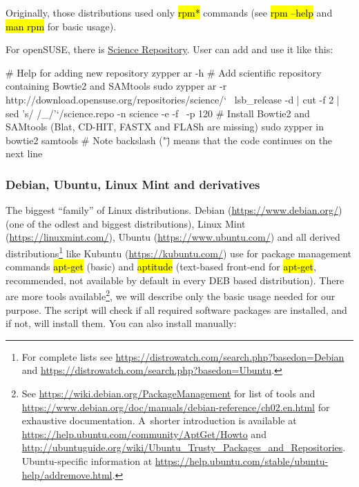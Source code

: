 \documentclass[a4paper, 11pt, twoside]{article}
\renewcommand{\texttt}[1]{\hl{\ttfamily #1}}
\begin{document}
Originally, those distributions used only \texttt{rpm*} commands (see \texttt{rpm --help} and \texttt{man rpm} for basic usage).

For openSUSE, there is \href{https://en.opensuse.org/openSUSE:Science_Repositories}{Science Repository}. User can add and use it like this:

\begin{bashcode}
  # Help for adding new repository
  zypper ar -h
  # Add scientific repository containing Bowtie2 and SAMtools
  sudo zypper ar -r http://download.opensuse.org/repositories/science/` \
    lsb_release -d | cut -f 2 | sed 's/ /_/'`/science.repo -n science -e -f \
    -p 120
  # Install Bowtie2 and SAMtools (Blat, CD-HIT, FASTX and FLASh are missing)
  sudo zypper in bowtie2 samtools
  # Note backslash ("\") means that the code continues on the next line
\end{bashcode}

\subsubsection{Debian, Ubuntu, Linux Mint and derivatives}

The biggest ``family'' of Linux distributions. Debian (\url{https://www.debian.org/}) (one of the odlest and biggest distributions), Linux Mint (\url{https://linuxmint.com/}), Ubuntu (\url{https://www.ubuntu.com/}) and all derived distributions\footnote{For complete lists see \url{https://distrowatch.com/search.php?basedon=Debian} and \url{https://distrowatch.com/search.php?basedon=Ubuntu}.} like Kubuntu (\url{https://kubuntu.com/}) use for package management commands \texttt{apt-get} (basic) and \texttt{aptitude} (text-based front-end for \texttt{apt-get}, recommended, not available by default in every DEB based distribution). There are more tools available\footnote{See \url{https://wiki.debian.org/PackageManagement} for list of tools and \url{https://www.debian.org/doc/manuals/debian-reference/ch02.en.html} for exhaustive documentation. A~shorter introduction is available at \url{https://help.ubuntu.com/community/AptGet/Howto} and \url{http://ubuntuguide.org/wiki/Ubuntu_Trusty_Packages_and_Repositories}. Ubuntu-specific information at \url{https://help.ubuntu.com/stable/ubuntu-help/addremove.html}.}, we will describe only the basic usage needed for our purpose. The script will check if all required software packages are installed, and if not, will install them. You can also install manually:
\end{document}
